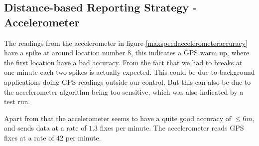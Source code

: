 \subsection{Distance-based Reporting Strategy - Accelerometer}
The readings from the accelerometer in figure-\ref{maxspeedaccelerometeraccuracy} have a spike at around location number 8, this indicates a GPS warm up, where the first location have a bad accuracy. From the fact that we had to breaks at one minute each two spikes is actually expected. This could be due to background applications doing GPS readings outside our control. But this can also be due to the accelerometer algorithm being too sensitive, which was also indicated by a test run.

Apart from that the accelerometer seems to have a quite good accuracy of $\leq 6m$, and sends data at a rate of $1.3$ fixes per minute. The accelerometer reads GPS fixes at a rate of $42$ per minute. 
